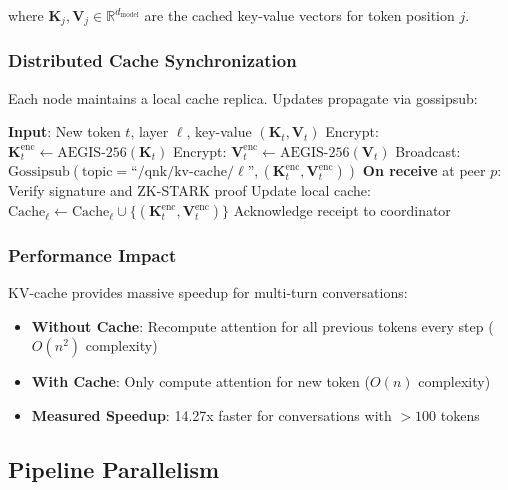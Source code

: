 \documentclass[11pt,a4paper]{article}
\newcommand{\vect}[1]{\mathbf{#1}}
\begin{document}
where $\vect{K}_j, \vect{V}_j \in \mathbb{R}^{d_{\text{model}}}$ are the cached key-value vectors for token position $j$.

\subsubsection{Distributed Cache Synchronization}

Each node maintains a local cache replica. Updates propagate via gossipsub:

\begin{algorithm}[H]
\caption{Distributed KV-Cache Update Protocol}
\begin{algorithmic}[1]
\STATE \textbf{Input}: New token $t$, layer $\ell$, key-value $(\vect{K}_t, \vect{V}_t)$
\STATE Encrypt: $\vect{K}_t^{\text{enc}} \gets \text{AEGIS-256}(\vect{K}_t)$
\STATE Encrypt: $\vect{V}_t^{\text{enc}} \gets \text{AEGIS-256}(\vect{V}_t)$
\STATE Broadcast: $\text{Gossipsub}(\text{topic}=\text{``/qnk/kv-cache/}\ell\text{''}, (\vect{K}_t^{\text{enc}}, \vect{V}_t^{\text{enc}}))$
\STATE \textbf{On receive} at peer $p$:
\STATE \quad Verify signature and ZK-STARK proof
\STATE \quad Update local cache: $\text{Cache}_\ell \gets \text{Cache}_\ell \cup \{(\vect{K}_t^{\text{enc}}, \vect{V}_t^{\text{enc}})\}$
\STATE \quad Acknowledge receipt to coordinator
\end{algorithmic}
\end{algorithm}

\subsubsection{Performance Impact}

KV-cache provides massive speedup for multi-turn conversations:

\begin{itemize}
    \item \textbf{Without Cache}: Recompute attention for all previous tokens every step ($O(n^2)$ complexity)
    \item \textbf{With Cache}: Only compute attention for new token ($O(n)$ complexity)
    \item \textbf{Measured Speedup}: 14.27x faster for conversations with $>100$ tokens
\end{itemize}

\subsection{Pipeline Parallelism}
\end{document}
